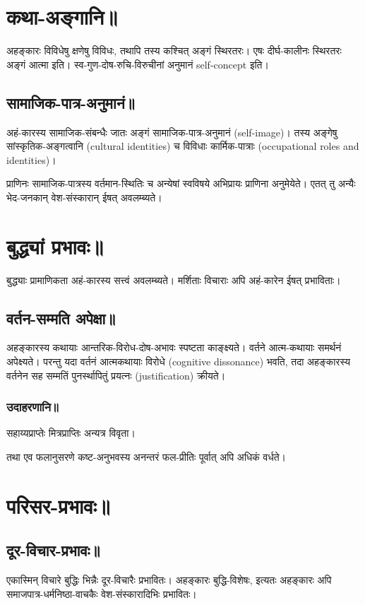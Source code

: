 \documentclass[oneside, article]{memoir}
\begin{document}
\section{कथा-अङ्गानि॥}
अहङ्कारः विविधेषु क्षणेषु विविधः, तथापि तस्य कश्चित् अङ्गं स्थिरतरः। एषः दीर्घ-कालीनः स्थिरतरः अङ्गं आत्मा इति। स्व-गुण-दोष-रुचि-विरुचीनां अनुमानं self-concept इति।

\subsection{सामाजिक-पात्र-अनुमानं॥}
अहं-कारस्य सामाजिक-संबन्धैः जातः अङ्गं सामाजिक-पात्र-अनुमानं (self-image)। तस्य अङ्गेषु सांस्कृतिक-अङ्गत्वानि (cultural identities) च विविधाः कार्मिक-पात्राः (occupational roles and identities)।

प्राणिनः सामाजिक-पात्रस्य वर्तमान-स्थितिः च अन्येषां स्वविषये अभिप्रायः प्राणिना अनुमेयेते। एतत् तु अन्यैः भेद-जनकान् वेश-संस्कारान् ईषत् अवलम्ब्यते।

\section{बुद्ध्यां‌ प्रभावः॥}
बुद्ध्याः प्रामाणिकता अहं-कारस्य सत्त्वं अवलम्ब्यते। मर्शिताः विचाराः अपि अहं-कारेन ईषत् प्रभाविताः।

\subsection{वर्तन-सम्मति अपेक्षा॥}
अहङ्कारस्य कथायाः आन्तरिक-विरोध-दोष-अभावः स्पष्टता काङ्क्ष्यते। वर्तने आत्म-कथायाः समर्थनं अपेक्ष्यते। परन्तु यदा‌ वर्तनं आत्मकथायाः विरोधे (cognitive dissonance) भवति, तदा अहङ्कारस्य वर्तनेन सह सम्मतिं पुनर्स्थापितुं प्रयत्नः (justification) क्रीयते।

\subsubsection{उदाहरणानि॥}
सहाय्यप्राप्तेः मित्रप्राप्तिः अन्यत्र विवृता।

तथा एव फलानुसरणे कष्ट-अनुभवस्य अनन्तरं फल-प्रीतिः पूर्वात् अपि अधिकं वर्धते।

\section{परिसर-प्रभावः॥}
\subsection{दूर-विचार-प्रभावः॥}
एकास्मिन् विचारे बुद्धिः भिन्नैः दूर-विचारैः प्रभावितः। अहङ्कारः बुद्धि-विशेषः, इत्यतः अहङ्कारः अपि समाजपात्र-धर्मनिष्ठा-वाचकैः वेश-संस्कारादिभिः प्रभावितः।
\end{document}
